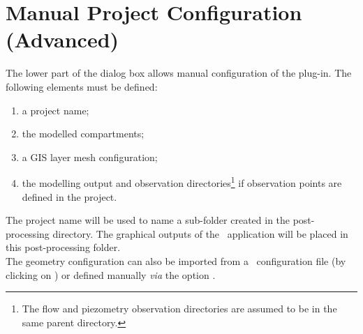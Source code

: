 \chapter{Manual Project Configuration (Advanced)}
\label{sec-config-manual}

\renewcommand{\headrulewidth}{0.3pt}
\fancyhead[LE]{\thepage} \fancyhead[RE]{\nouppercase{\textbf{\leftmark}}}
\fancyhead[RO]{\thepage} \fancyhead[LO]{\nouppercase{\textbf{\rightmark}}}
\fancyfoot[L,C,R]{}

\setlength{\parindent}{0.35cm}

\minitoc
\newpage


The lower part of the  dialog box allows manual configuration
of the plug-in. The following elements must be defined:
\begin{enumerate}
    \item a project name;

    \item the modelled compartments;

    \item a GIS layer mesh configuration;

    \item the modelling output and observation directories\footnote{The flow and piezometry observation directories are assumed to be in the same parent directory.} if observation points are defined in the project.
\end{enumerate}

The project name will be used to name a sub-folder created in the post-processing directory. The graphical outputs of the \cwv~application will be placed
in this post-processing folder.\\

The geometry configuration can also be imported from a \json~configuration file (by clicking on )
or defined manually \textit{via} the option .

